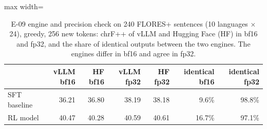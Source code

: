 \begin{table}[htbp]
\centering\footnotesize\setlength{\tabcolsep}{3pt}
\caption{E-09 engine and precision check on 240 FLORES+ sentences (10 languages $\times$ 24), greedy, 256 new tokens: chrF++ of vLLM and Hugging Face (HF) in bf16 and fp32, and the share of identical outputs between the two engines. The engines differ in bf16 and agree in fp32.}\label{tab:e09}
\begin{adjustbox}{max width=\linewidth}\begin{tabular}{@{}lrrrrrr@{}}
\toprule
 & vLLM bf16 & HF bf16 & vLLM fp32 & HF fp32 & identical bf16 & identical fp32\\
\midrule
SFT baseline & 36.21 & 36.80 & 38.19 & 38.18 & 9.6\% & 98.8\% \\
RL model & 40.47 & 40.28 & 40.59 & 40.61 & 16.7\% & 97.1\% \\
\bottomrule
\end{tabular}\end{adjustbox}
\end{table}
